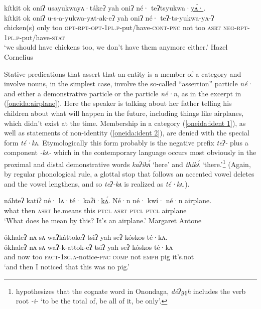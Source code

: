 \documentclass[output=paper,colorlinks,citecolor=brown]{langscibook}
\begin{document}
\begin{exe}
\ex\label{oneida:poss}
    \glll kítkit ok oniʔ usayukwayʌ·tákeʔ yah oniʔ né· teʔtsyukwa·\uline{yʌ́·}. \\
    kítkit ok oniʔ u-s-a-yukwa-yʌt-ak-eʔ yah oniʔ né· teʔ-ts-yukwa-yʌ-ʔ \\
    chicken(s) only too \textsc{opt-rpt-opt-1pl.p}-put/have-\textsc{cont-pnc} not too \textsc{asrt} \textsc{neg-rpt-1pl.p}-put/have-\textsc{stat} \\
    \glt `we should have chickens too, we don't have them anymore either.' Hazel Cornelius \citep[181 (13)]{MichelsonEtAl2016}
\end{exe}

Stative predications that assert that an entity is a member of a category and involve nouns, in the simplest case, involve the so-called ``assertion'' particle \textit{né·} and either a demonstrative particle or the particle \textit{né·n}, as in the excerpt in (\ref{oneida:airplane}). Here the speaker is talking about her father telling his children about what will happen in the future, including things like airplanes, which didn't exist at the time. Membership in a category (\ref{oneida:ident 1}), as well as statements of non-identity (\ref{oneida:ident 2}), are denied with the special form \textit{té·kʌ}. Etymologically this form probably is the negative prefix \textit{teʔ-} plus a component \textit{-kʌ-} which in the contemporary language occurs most obviously in the proximal and distal demonstrative words \textit{kaʔikʌ́} `here' and \textit{thikʌ́} `there.'\footnote{\citet[214]{Woodbury2018} hypothesizes that the cognate word in Onondaga, \textit{déʔgęh} includes the verb root \textit{-i-} `to be the total of, be all of it, be only'.} (Again, by regular phonological rule, a glottal stop that follows an accented vowel deletes and the vowel lengthens, and so \textit{teʔ-kʌ} is realized as \textit{té·kʌ}.). 
 
\ea\label{oneida:airplane}
    \gll náhteʔ katiʔ né· lʌ·té· kaʔi·\uline{kʌ́}. Né·n né· kwí· né·n airplane. \\
    what then \textsc{asrt} {he.means} this \textsc{ptcl} \textsc{asrt} \textsc{ptcl} \textsc{ptcl} airplane \\
    \glt `What does he mean by this? It's an airplane.' Margaret Antone \citep[176 (27--28)]{MichelsonEtAl2016}
\z

\ea\label{oneida:ident 1}
    \glll \'okhaleʔ nʌ sʌ waʔkáttokeʔ tsiʔ yah seʔ k\'oskos té·kʌ. \\
    \'okhaleʔ nʌ sʌ waʔ-k-attok-eʔ tsiʔ yah seʔ k\'oskos té·kʌ \\
    and now too \textsc{fact-1sg.a}-notice-\textsc{pnc} \textsc{comp} not \textsc{emph} pig {it’s.not} \\
    \glt `and then I noticed that this was no pig.’ \citet[75]{Abbott1982} 
\z
\end{document}
